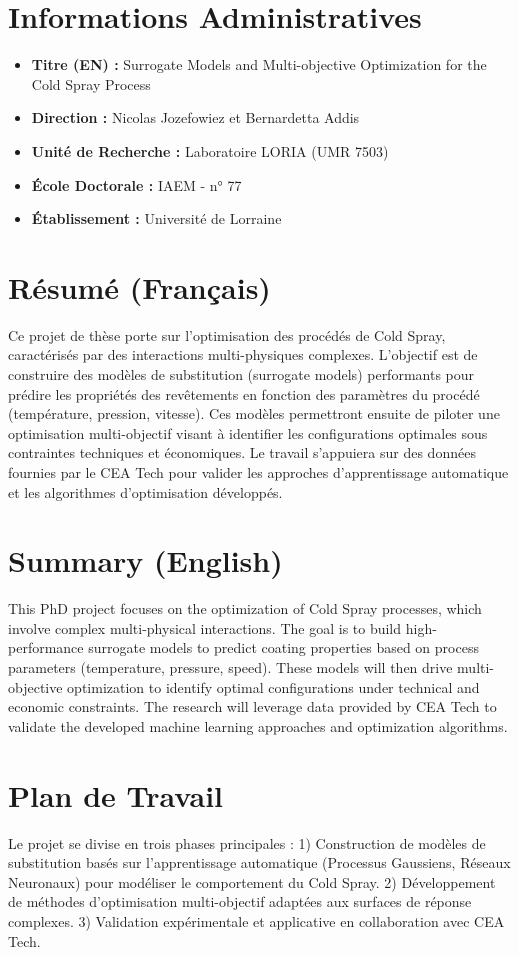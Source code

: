 \documentclass[a4paper,11pt]{article}
\begin{document}
\section*{Informations Administratives}
\begin{itemize}[label=--]
    \item \textbf{Titre (EN) :} Surrogate Models and Multi-objective Optimization for the Cold Spray Process
    \item \textbf{Direction :} Nicolas Jozefowiez et Bernardetta Addis
    \item \textbf{Unité de Recherche :} Laboratoire LORIA (UMR 7503)
    \item \textbf{École Doctorale :} IAEM - n° 77
    \item \textbf{Établissement :} Université de Lorraine
\end{itemize}

\section*{Résumé (Français)}
Ce projet de thèse porte sur l’optimisation des procédés de Cold Spray, caractérisés par des interactions multi-physiques complexes. L’objectif est de construire des modèles de substitution (surrogate models) performants pour prédire les propriétés des revêtements en fonction des paramètres du procédé (température, pression, vitesse). Ces modèles permettront ensuite de piloter une optimisation multi-objectif visant à identifier les configurations optimales sous contraintes techniques et économiques. Le travail s'appuiera sur des données fournies par le CEA Tech pour valider les approches d'apprentissage automatique et les algorithmes d'optimisation développés.

\section*{Summary (English)}
This PhD project focuses on the optimization of Cold Spray processes, which involve complex multi-physical interactions. The goal is to build high-performance surrogate models to predict coating properties based on process parameters (temperature, pressure, speed). These models will then drive multi-objective optimization to identify optimal configurations under technical and economic constraints. The research will leverage data provided by CEA Tech to validate the developed machine learning approaches and optimization algorithms.

\section{Plan de Travail}
Le projet se divise en trois phases principales : 1) Construction de modèles de substitution basés sur l'apprentissage automatique (Processus Gaussiens, Réseaux Neuronaux) pour modéliser le comportement du Cold Spray. 2) Développement de méthodes d'optimisation multi-objectif adaptées aux surfaces de réponse complexes. 3) Validation expérimentale et applicative en collaboration avec CEA Tech.
\end{document}
